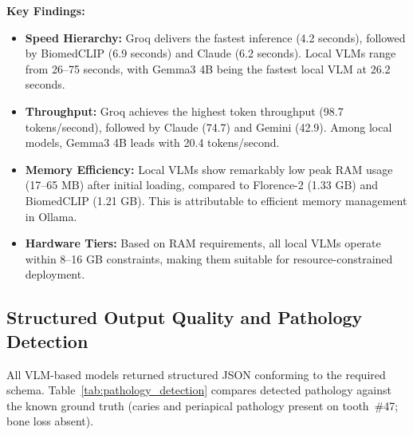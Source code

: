 \documentclass[12pt,a4paper]{report}
\begin{document}
\textbf{Key Findings:}
\begin{itemize}
    \item \textbf{Speed Hierarchy:} Groq delivers the fastest inference (4.2 seconds), followed by BiomedCLIP (6.9 seconds) and Claude (6.2 seconds). Local VLMs range from 26–75 seconds, with Gemma3 4B being the fastest local VLM at 26.2 seconds.
    \item \textbf{Throughput:} Groq achieves the highest token throughput (98.7 tokens/second), followed by Claude (74.7) and Gemini (42.9). Among local models, Gemma3 4B leads with 20.4 tokens/second.
    \item \textbf{Memory Efficiency:} Local VLMs show remarkably low peak RAM usage (17–65 MB) after initial loading, compared to Florence-2 (1.33 GB) and BiomedCLIP (1.21 GB). This is attributable to efficient memory management in Ollama.
    \item \textbf{Hardware Tiers:} Based on RAM requirements, all local VLMs operate within 8–16 GB constraints, making them suitable for resource-constrained deployment.
\end{itemize}

\subsection{Structured Output Quality and Pathology Detection}

All VLM-based models returned structured JSON conforming to the required schema.
Table~\ref{tab:pathology_detection} compares detected pathology against the known
ground truth (caries and periapical pathology present on tooth~\#47; bone loss
absent).
\end{document}
